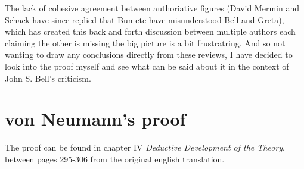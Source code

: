 \documentclass[a4paper]{article}
\theoremstyle{definition}
\theoremstyle{plain}
\begin{document}
    The lack of cohesive agreement between authoriative
    figures (David Mermin and Schack have since replied that
    Bun etc have misunderstood Bell and Greta), which has
    created this back and forth discussion between multiple
    authors each claiming the other is missing the big
    picture is a bit frustratring.  And so not wanting to
    draw any conclusions directly from these reviews, I have
    decided to look into the proof myself and see what can
    be said about it in the context of John S. Bell's
    criticism.

    \section{von Neumann's proof}

    The proof can be found in chapter IV \textit{Deductive
    Development of the Theory}, between pages 295-306 from
    the original english translation. 
\end{document}
